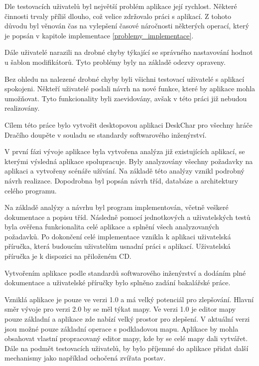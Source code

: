 \documentclass[thesis=B,czech]{resources/FITthesis}[2012/06/26]
\begin{document}
Dle testovacích uživatelů byl největší problém aplikace její rychlost. Některé činnosti trvaly příliš dlouho, což velice zdržovalo práci s aplikací. Z tohoto důvodu byl věnován čas na vylepšení časové náročnosti některých operací, který je popsán v kapitole implementace \ref{problemy_implementace}. \par

Dále uživatelé narazili na drobné chyby týkající se správného nastavování hodnot u šablon modifikátorů. Tyto problémy byly na základě odezvy opraveny. \par

Bez ohledu na nalezené drobné chyby byli všichni testovací uživatelé s aplikací spokojeni. Někteří uživatelé poslali návrh na nové funkce, které by aplikace mohla umožňovat. Tyto funkcionality byli zaevidovány, avšak v této práci již nebudou realizovány. 

\begin{conclusion}
Cílem této práce bylo vytvořit desktopovou aplikaci DeskChar pro všechny hráče Dračího doupěte v souladu se standardy softwarového inženýrství. \par

V první fázi vývoje aplikace byla vytvořena analýza již existujících aplikací, se kterými výsledná aplikace spolupracuje. Byly analyzovány všechny požadavky na aplikaci a vytvořeny scénáře užívání. Na základě této analýzy vznikl podrobný návrh realizace. Dopodrobna byl popsán návrh tříd, databáze a architektury celého programu. \par

Na základě analýzy a návrhu byl program implementován, včetně veškeré dokumentace a popisu tříd. Následně pomocí jednotkových a uživatelských testů byla ověřena funkcionalita celé aplikace a splnění všech analyzovaných požadavků. Po dokončení celé implementace vznikla k aplikaci uživatelská příručka, která budoucím uživatelům usnadní práci s aplikací. Uživatelská příručka je k dispozici na přiloženém CD. \par

Vytvořením aplikace podle standardů softwarového inženýrství a dodáním plné dokumentace a uživatelské příručky bylo splněno zadání bakalářské práce. \par

Vzniklá aplikace je pouze ve verzi 1.0 a má velký potenciál pro zlepšování. Hlavní směr vývoje pro verzi 2.0 by se měl týkat mapy. Ve verzi 1.0 je editor mapy pouze základní a aplikace zde nabízí velký prostor pro zlepšení. V aktuální verzi jsou možné pouze základní operace s podkladovou mapu. Aplikace by mohla obsahovat vlastní propracovaný editor mapy, kde by se celé mapy dali vytvářet. Dále na podmět testovacích uživatelů, by bylo příjemné do aplikace přidat další mechanismy jako například ochočená zvířata postav.

\end{conclusion}
\end{document}
